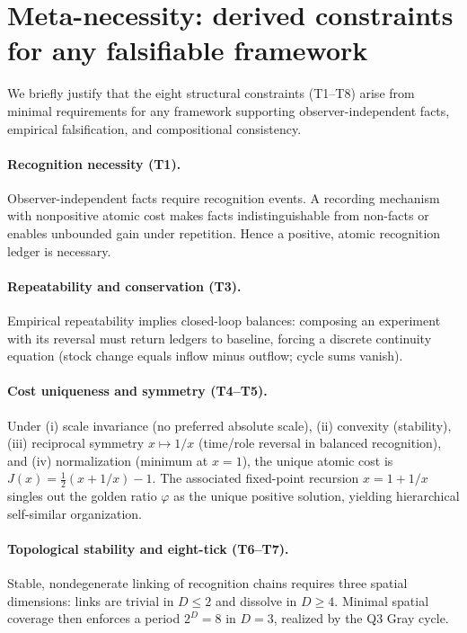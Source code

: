 \documentclass[11pt]{article}
\begin{document}
\section{Meta-necessity: derived constraints for any falsifiable framework}\label{sec:meta-necessity}
We briefly justify that the eight structural constraints (T1--T8) arise from minimal requirements for any framework supporting observer-independent facts, empirical falsification, and compositional consistency.

\paragraph{Recognition necessity (T1).} Observer-independent facts require recognition events. A recording mechanism with nonpositive atomic cost makes facts indistinguishable from non-facts or enables unbounded gain under repetition. Hence a positive, atomic recognition ledger is necessary.

\paragraph{Repeatability and conservation (T3).} Empirical repeatability implies closed-loop balances: composing an experiment with its reversal must return ledgers to baseline, forcing a discrete continuity equation (stock change equals inflow minus outflow; cycle sums vanish).

\paragraph{Cost uniqueness and symmetry (T4--T5).} Under (i) scale invariance (no preferred absolute scale), (ii) convexity (stability), (iii) reciprocal symmetry \(x\mapsto 1/x\) (time/role reversal in balanced recognition), and (iv) normalization (minimum at \(x=1\)), the unique atomic cost is \(J(x)=\tfrac{1}{2}(x+1/x)-1\). The associated fixed-point recursion \(x=1+1/x\) singles out the golden ratio \(\varphi\) as the unique positive solution, yielding hierarchical self\mbox{-}similar organization.

\paragraph{Topological stability and eight\mbox{-}tick (T6--T7).} Stable, nondegenerate linking of recognition chains requires three spatial dimensions: links are trivial in \(D\le 2\) and dissolve in \(D\ge 4\). Minimal spatial coverage then enforces a period \(2^D=8\) in \(D=3\), realized by the Q3 Gray cycle.
\end{document}
